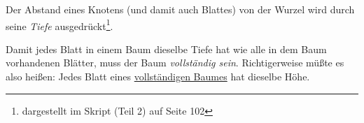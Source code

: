 Der Abstand eines Knotens (und damit auch Blattes) von der Wurzel wird durch seine \textit{Tiefe} ausgedrückt\footnote{
dargestellt im Skript (Teil 2) auf Seite 102
}.

Damit jedes Blatt in einem Baum dieselbe Tiefe hat wie alle in dem Baum vorhandenen Blätter, muss der Baum \textit{vollständig sein}.
Richtigerweise müßte es also heißen: Jedes Blatt eines \underline{vollständigen Baumes} hat dieselbe Höhe.


